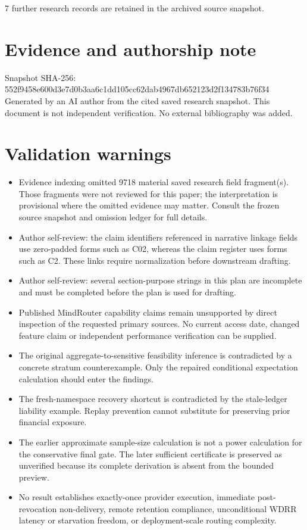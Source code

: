 \documentclass[11pt]{article}
\begin{document}
7 further research records are retained in the archived source snapshot.
\section*{Evidence and authorship note}
Snapshot SHA-256: 552f9458e600d3e7d0b3aa6c1dd105cc62dab4967db652123d2f134783b76f34
Generated by an AI author from the cited saved research snapshot. This document is not independent verification. No external bibliography was added.
\section*{Validation warnings}
\begin{itemize}
\item Evidence indexing omitted 9718 material saved research field fragment(s). Those fragments were not reviewed for this paper; the interpretation is provisional where the omitted evidence may matter. Consult the frozen source snapshot and omission ledger for full details.
\item Author self-review: the claim identifiers referenced in narrative linkage fields use zero-padded forms such as C02, whereas the claim register uses forms such as C2. These links require normalization before downstream drafting.
\item Author self-review: several section-purpose strings in this plan are incomplete and must be completed before the plan is used for drafting.
\item Published MindRouter capability claims remain unsupported by direct inspection of the requested primary sources. No current access date, changed feature claim or independent performance verification can be supplied.
\item The original aggregate-to-sensitive feasibility inference is contradicted by a concrete stratum counterexample. Only the repaired conditional expectation calculation should enter the findings.
\item The fresh-namespace recovery shortcut is contradicted by the stale-ledger liability example. Replay prevention cannot substitute for preserving prior financial exposure.
\item The earlier approximate sample-size calculation is not a power calculation for the conservative final gate. The later sufficient certificate is preserved as unverified because its complete derivation is absent from the bounded preview.
\item No result establishes exactly-once provider execution, immediate post-revocation non-delivery, remote retention compliance, unconditional WDRR latency or starvation freedom, or deployment-scale routing complexity.

\end{itemize}
\end{document}
